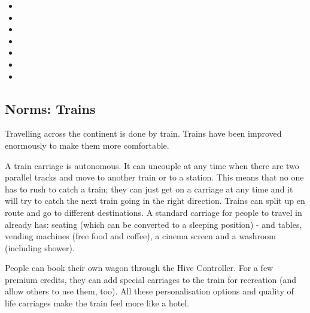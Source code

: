 \begin{pioneertalk}[title=Inshallah 2]
    \begin{itemize}
        \item {}
        \item {}
        \item {}
        \item {}
        \item {}
        \item {}
        \item {}
    \end{itemize}
\end{pioneertalk}

\subsection{Norms: Trains}

Travelling across the continent is done by train. Trains have been improved enormously to make them more comfortable.

A train carriage is autonomous. It can uncouple at any time when there are two parallel tracks and move to another train or to a station. This means that no one has to rush to catch a train; they can just get on a carriage at any time and it will try to catch the next train going in the right direction.
Trains can split up en route and go to different destinations.
A standard carriage for people to travel in already has: seating (which can be converted to a sleeping position) - and tables, vending machines (free food and coffee), a cinema screen and a washroom (including shower).

People can book their own wagon through the Hive Controller. For a few premium credits, they can add special carriages to the train for recreation (and allow others to use them, too). All these personalisation options and quality of life carriages make the train feel more like a hotel.

